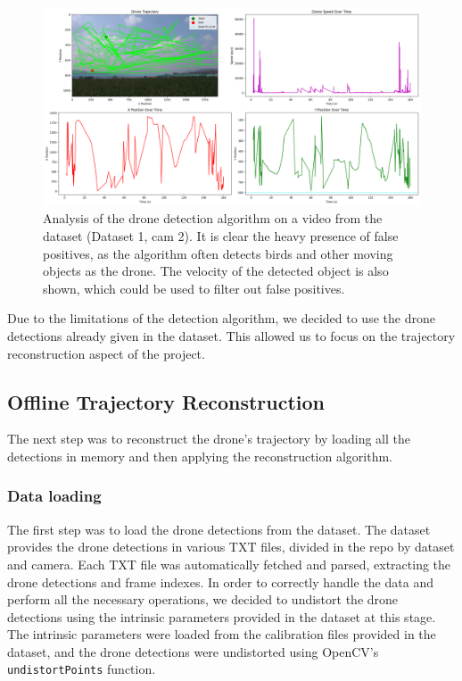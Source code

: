 \documentclass[11pt]{article}
\begin{document}
\begin{figure}[H]
    \centering
    \includegraphics[width=\textwidth]{../plots/drone_tracking_output_trajectory.png}
    \caption{Analysis of the drone detection algorithm on a video from the dataset (Dataset 1, cam 2). It is clear the heavy presence of false positives, as the algorithm often detects birds and other moving objects as the drone. The velocity of the detected object is also shown, which could be used to filter out false positives.}
    \label{fig:detection_plots}
\end{figure}

Due to the limitations of the detection algorithm, we decided to use the drone detections already given in the dataset. This allowed us to focus on the trajectory reconstruction aspect of the project.

\subsection{Offline Trajectory Reconstruction}

The next step was to reconstruct the drone's trajectory by loading all the detections in memory and then applying the reconstruction algorithm.

\subsubsection{Data loading}
\label{sec:data_loading}

The first step was to load the drone detections from the dataset. The dataset provides the drone detections in various TXT files, divided in the repo by dataset and camera. Each TXT file was automatically fetched and parsed, extracting the drone detections and frame indexes. In order to correctly handle the data and perform all the necessary operations, we decided to undistort the drone detections using the intrinsic parameters provided in the dataset at this stage. The intrinsic parameters were loaded from the calibration files provided in the dataset, and the drone detections were undistorted using OpenCV's \texttt{undistortPoints} function.
\end{document}
